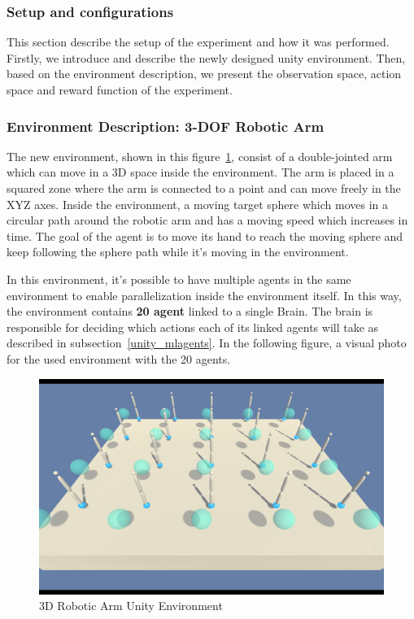 \subsubsection{Setup and configurations}

This section describe the setup of the experiment and how it was performed. Firstly, we introduce and describe the newly designed unity environment. Then, based on the environment description, we present the observation space, action space and reward function of the experiment.

\subsubsection{Environment Description: 3-DOF Robotic Arm}

The new environment, shown in this figure~\ref{fig:unity_environment}, consist of a double-jointed arm which can move in a 3D space inside the environment. The arm is placed in a squared zone where the arm is connected to a point and can move freely in the XYZ axes. Inside the environment, a moving target sphere which moves in a circular path around the robotic arm and has a moving speed which increases in time. The goal of the agent is to move its hand to reach the moving sphere and keep following the sphere path while it's moving in the environment.

In this environment, it's possible to have multiple agents in the same environment to enable parallelization inside the environment itself. In this way, the environment contains \textbf{20 agent} linked to a single Brain. The brain is responsible for deciding which actions each of its linked agents will take as described in subsection~\ref{unity_mlagents}. In the following figure, a visual photo for the used environment with the 20 agents.

\begin{figure}[!htb]
		\centering
		\includegraphics[width=\linewidth]{figures/envs/unity_reacher_20.png}
		\caption{3D Robotic Arm Unity Environment}
		\label{fig:unity_environment}
\end{figure}

